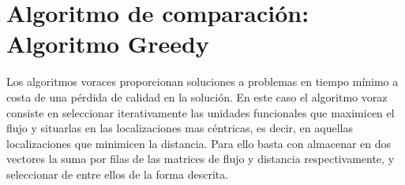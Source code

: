 \documentclass[11pt,a4paper]{article}
\begin{document}
\newpage
		
\section{Algoritmo de comparación: Algoritmo Greedy}

	\noindent Los algoritmos voraces proporcionan soluciones a problemas en tiempo mínimo a costa de una pérdida de calidad en la solución. En este caso el algoritmo voraz consiste en seleccionar iterativamente las unidades funcionales que maximicen el flujo y situarlas en las localizaciones mas céntricas, es decir, en aquellas localizaciones que minimicen la distancia. Para ello basta con almacenar en dos vectores la suma por filas de las matrices de flujo y distancia respectivamente, y seleccionar de entre ellos de la forma descrita.
	
\end{document}
